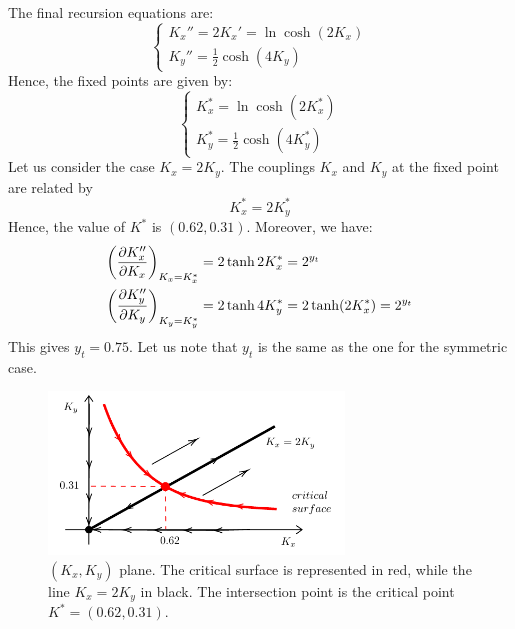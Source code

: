 \documentclass[../main/main.tex]{subfiles}
\begin{document}
The final recursion equations are:
\begin{equation}
  \begin{cases}
     K_x'' = 2 K_x' = \ln \cosh (2K_x) \\
       K_y'' = \frac{1}{2} \cosh (4K_y)
  \end{cases}
\end{equation}
Hence, the fixed points are given by:
\begin{equation}
  \begin{cases}
     K_x^* = \ln \cosh (2K_x^*) \\
       K_y^* = \frac{1}{2} \cosh (4K_y^*)
  \end{cases}
\end{equation}
Let us consider the case \( K_x = 2K_y \).
The couplings \( K_x \) and \( K_y \) at the fixed point are related by
\begin{equation}
  K_x^* = 2 K_y^*
\end{equation}
Hence, the value of \( K^* \) is \( (0.62,0.31) \). Moreover, we have:
\begin{subequations}
\begin{align*}
  \qty(\pdv{K_x''}{K_x} )_{K_x=K_x^*}  &=  2 \tanh 2K_x^* = 2^{y_t} \\
  \qty(\pdv{K_y''}{K_y} )_{K_y=K_y^*}  &=  2 \tanh 4K_y^* =  2 \tanh (2K_x^*) =2^{y_t}
\end{align*}
\end{subequations}
This gives \( y_t = 0.75 \). Let us note that \( y_t \) is the same as the one for the symmetric case.

\begin{figure}[h!]
\centering
\includegraphics[width=0.7\textwidth]{../lessons/20_image/18.pdf}
\caption{\label{fig:20_15} \( (K_x,K_y) \) plane. The critical surface is represented in red, while the line \( K_x = 2 K_y \) in black. The intersection point is the critical point \( K^* = (0.62,0.31) \).  }
\end{figure}
\end{document}
